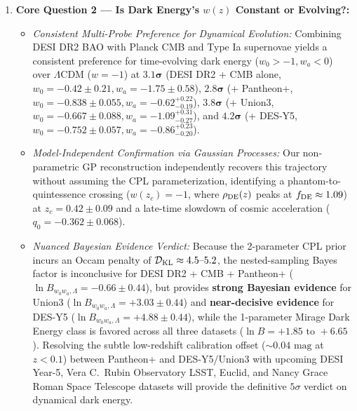 \documentclass[11pt,letterpaper]{article}
\begin{document}
\begin{enumerate}
\begin{itemize}
    \end{itemize}
    \item \textbf{Core Question 2 — Is Dark Energy's $w(z)$ Constant or Evolving?:}
    \begin{itemize}
        \setlength{\itemsep}{2pt}
        \item \emph{Consistent Multi-Probe Preference for Dynamical Evolution:} Combining DESI DR2 BAO with Planck CMB and Type Ia supernovae yields a consistent preference for time-evolving dark energy ($w_0 > -1, w_a < 0$) over $\Lambda$CDM ($w=-1$) at $\mathbf{3.1}\boldsymbol{\sigma}$ (DESI DR2 + CMB alone, $w_0 = -0.42 \pm 0.21, w_a = -1.75 \pm 0.58$), $\mathbf{2.8}\boldsymbol{\sigma}$ (+ Pantheon+, $w_0 = -0.838 \pm 0.055, w_a = -0.62^{+0.22}_{-0.19}$), $\mathbf{3.8}\boldsymbol{\sigma}$ (+ Union3, $w_0 = -0.667 \pm 0.088, w_a = -1.09^{+0.31}_{-0.27}$), and $\mathbf{4.2}\boldsymbol{\sigma}$ (+ DES-Y5, $w_0 = -0.752 \pm 0.057, w_a = -0.86^{+0.23}_{-0.20}$).
        \item \emph{Model-Independent Confirmation via Gaussian Processes:} Our non-parametric GP reconstruction independently recovers this trajectory without assuming the CPL parameterization, identifying a phantom-to-quintessence crossing ($w(z_c) = -1$, where $\rho_{\rm DE}(z)$ peaks at $f_{\rm DE} \approx 1.09$) at $z_c = 0.42 \pm 0.09$ and a late-time slowdown of cosmic acceleration ($q_0 = -0.362 \pm 0.068$).
        \item \emph{Nuanced Bayesian Evidence Verdict:} Because the 2-parameter CPL prior incurs an Occam penalty of $\mathcal{D}_{\rm KL} \approx 4.5\text{--}5.2$, the nested-sampling Bayes factor is inconclusive for DESI DR2 + CMB + Pantheon+ ($\ln B_{w_0 w_a, \Lambda} = -0.66 \pm 0.44$), but provides \textbf{strong Bayesian evidence} for Union3 ($\ln B_{w_0 w_a, \Lambda} = +3.03 \pm 0.44$) and \textbf{near-decisive evidence} for DES-Y5 ($\ln B_{w_0 w_a, \Lambda} = +4.88 \pm 0.44$), while the 1-parameter Mirage Dark Energy class is favored across all three datasets ($\ln B = +1.85\text{ to }+6.65$). Resolving the subtle low-redshift calibration offset ($\sim 0.04\text{ mag}$ at $z < 0.1$) between Pantheon+ and DES-Y5/Union3 with upcoming DESI Year-5, Vera C.\ Rubin Observatory LSST, Euclid, and Nancy Grace Roman Space Telescope datasets will provide the definitive $5\sigma$ verdict on dynamical dark energy.
    \end{itemize}
\end{enumerate}
\end{document}
